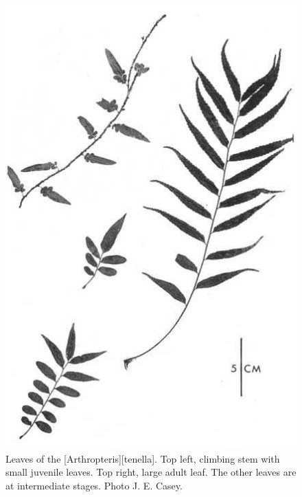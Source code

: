 \begin{figure}[t]
\begin{minipage}[t]{0.9\textwidth}
\begin{minipage}[t]{(\textwidth-\fgap) * \real{0.424}}
			\caption[Leaves of the climbing fern \emph{Blechnum filiforme}]{Leaves of the  [Blechnum][filiforme].
			Top right, a small leaf from the base of a tree trunk.
			Left, large leaf from \SI{2}{\metre} above ground level.
			Lower right, fertile leaf.
			Photo: M. D. King.}%
			\label{fig:27fern}
		\end{minipage}\hspace{\fgap}%
		\begin{minipage}[t]{(\textwidth-\fgap) * \real{0.576}}
			\centering
			\includegraphics[width=\textwidth]{graphics/fig_028}
			\caption[Leaves of the climbing fern \emph{Arthropteris tenella}]{Leaves of the  [Arthropteris][tenella].
			Top left, climbing stem with small juvenile leaves.
			Top right, large adult leaf.
			The other leaves are at intermediate stages.
			Photo  J. E. Casey.}%
			\label{fig:28fern}
		\end{minipage}
	\end{minipage}
\end{figure}

